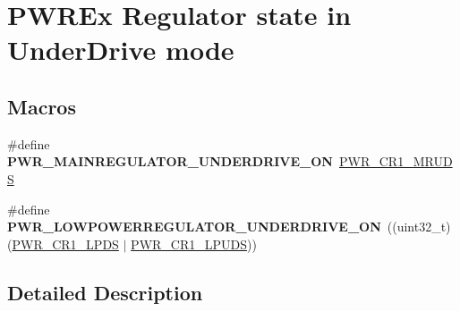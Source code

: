 \hypertarget{group___p_w_r_ex___regulator__state__in___under_drive__mode}{}\section{P\+W\+R\+Ex Regulator state in Under\+Drive mode}
\label{group___p_w_r_ex___regulator__state__in___under_drive__mode}
\subsection*{Macros}
\begin{DoxyCompactItemize}
\item 
\mbox{\label{group___p_w_r_ex___regulator__state__in___under_drive__mode_gafb4358eecfe7e28595e4004e0232b0c7}} 
\#define {\bfseries P\+W\+R\+\_\+\+M\+A\+I\+N\+R\+E\+G\+U\+L\+A\+T\+O\+R\+\_\+\+U\+N\+D\+E\+R\+D\+R\+I\+V\+E\+\_\+\+ON}~\mbox{\hyperlink{group___peripheral___registers___bits___definition_ga3a2d9c42baced6964f88a2f5b82efb0a}{P\+W\+R\+\_\+\+C\+R1\+\_\+\+M\+R\+U\+DS}}
\item 
\mbox{\label{group___p_w_r_ex___regulator__state__in___under_drive__mode_gac401bc466719bff4d54854cce6382be0}} 
\#define {\bfseries P\+W\+R\+\_\+\+L\+O\+W\+P\+O\+W\+E\+R\+R\+E\+G\+U\+L\+A\+T\+O\+R\+\_\+\+U\+N\+D\+E\+R\+D\+R\+I\+V\+E\+\_\+\+ON}~((uint32\+\_\+t)(\mbox{\hyperlink{group___peripheral___registers___bits___definition_gacc60f674740c4000a25b0e3e50ede47d}{P\+W\+R\+\_\+\+C\+R1\+\_\+\+L\+P\+DS}} $\vert$ \mbox{\hyperlink{group___peripheral___registers___bits___definition_ga3c513409a6f2017167955cb73c42654c}{P\+W\+R\+\_\+\+C\+R1\+\_\+\+L\+P\+U\+DS}}))
\end{DoxyCompactItemize}


\subsection{Detailed Description}
